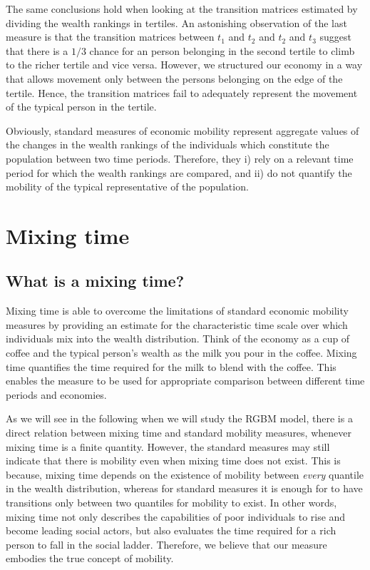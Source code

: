 \documentclass[11pt]{article}
\numberwithin{equation}{section}
\begin{document}
The same conclusions hold when looking at the transition matrices estimated by dividing the wealth rankings in tertiles. An astonishing observation of the last measure is that the transition matrices between $t_1$ and $t_2$ and $t_2$ and $t_3$ suggest that there is a $1/3$ chance for an person belonging in the second tertile to climb to the richer tertile and vice versa. However, we structured our economy in a way that allows movement only between the persons belonging on the edge of the tertile. Hence, the transition matrices fail to adequately represent the movement of the typical person in the tertile.

Obviously, standard measures of economic mobility represent aggregate values of the changes in the wealth rankings of the individuals which constitute the population between two time periods. Therefore, they i) rely on a relevant time period for which the wealth rankings are compared, and ii) do not quantify the mobility of the typical representative of the population.

\section{Mixing time}

\subsection{What is a mixing time?}\label{sec:what}

Mixing time is able to overcome the limitations of standard economic mobility measures by providing an estimate for the characteristic time scale over which individuals mix into the wealth distribution. Think of the economy as a cup of coffee and the typical person's wealth as the milk you pour in the coffee. Mixing time quantifies the time required for the milk to blend with the coffee. This enables the measure to be used for appropriate comparison between different time periods and economies.

As we will see in the following when we will study the RGBM model, there is a direct relation between mixing time and standard mobility measures, whenever mixing time is a finite quantity. However, the standard measures may still indicate that there is mobility even when mixing time does not exist. This is because,  mixing time depends on the existence of mobility between \textit{every} quantile in the wealth distribution, whereas for standard measures it is enough for to have transitions only between two quantiles for mobility to exist. In other words, mixing time not only describes the capabilities of poor individuals to rise and become leading social actors, but also evaluates the time required for a rich person to fall in the social ladder. Therefore, we believe that our measure embodies the true concept of mobility.
\end{document}
